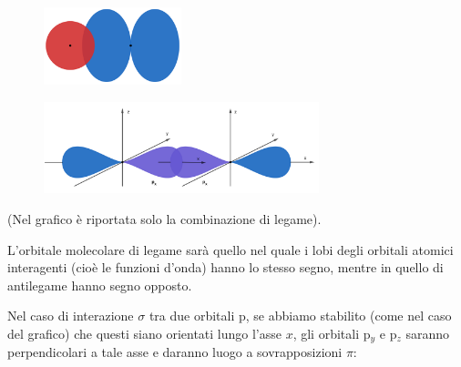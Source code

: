 \hspace{1cm}\begin{minipage}{0.36\textwidth}
    \begin{figure}[H]
        \includegraphics[width=4cm]{immagini/legame_sigma_s_p.png}
    \end{figure}
    \end{minipage} 
\begin{minipage}{0.4\textwidth}
    \vspace{-0.5cm}\begin{figure}[H]
        \includegraphics[width=8cm]{immagini/legame_sigma_p_p.png}
    \end{figure}
    \end{minipage}

\vspace{0.2cm}(Nel grafico è riportata solo la combinazione di legame).

L'orbitale molecolare di legame sarà quello nel quale i lobi degli orbitali atomici interagenti (cioè le funzioni d'onda) hanno lo stesso segno, mentre in quello di antilegame hanno segno opposto.

Nel caso di interazione $\sigma$ tra due orbitali p, se abbiamo stabilito (come nel caso del grafico) che questi siano orientati lungo l'asse $x$, gli orbitali p$_y$ e p$_z$ saranno perpendicolari a tale asse e daranno luogo a sovrapposizioni $\pi$:

